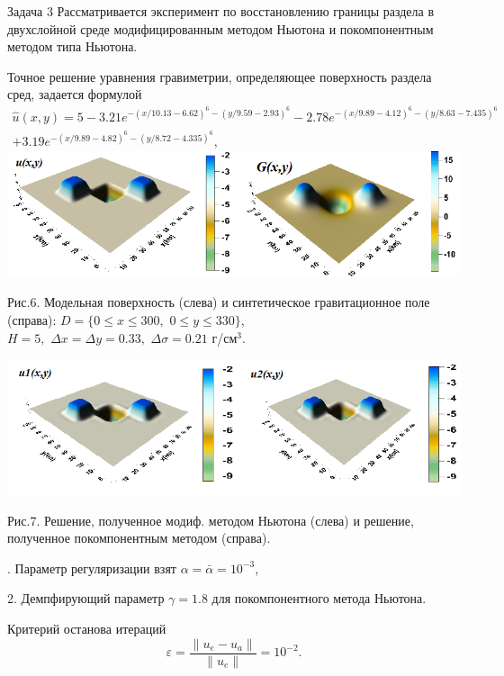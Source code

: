 \documentclass[10pt,pdf, mathserif, hyperref={unicode}]{beamer}
\begin{document}
\begin{frame}{Задача 3}
	Рассматривается эксперимент по восстановлению границы раздела в двухслойной среде модифицированным методом Ньютона и покомпонентным методом типа Ньютона.
	
	Точное решение уравнения гравиметрии, определяющее поверхность раздела сред, задается формулой
	\begin{equation*}
	\begin{aligned}
	\hat{u}(x,y)=5-3.21e^{-(x/10.13-6.62)^6-(y/9.59-2.93)^6}-2.78e^{-(x/9.89-4.12)^6-(y/8.63-7.435)^6}\\+3.19e^{-(x/9.89-4.82)^6-(y/8.72-4.335)^6},
	\end{aligned} 
	\end{equation*}
	\centering
	\includegraphics[width=\textwidth, height=0.35\textheight]{gravy_kiev2015.png}
	
	Рис.6. Модельная поверхность (слева) и синтетическое гравитационное поле (справа): $D=\{0\le x\le 300, \,\,0\le y\le 330\}$, \\ $  H=5,\,\,\Delta x=\Delta y=0.33,\,\,\Delta\sigma=0.21$ г/см$^3$.
\end{frame}
\begin{frame}
	\includegraphics[width=\textwidth, height=0.35\textheight]{gravy_kiev2015_methods.png}
	
	\centering
	Рис.7. Решение, полученное модиф. методом Ньютона (слева) и решение, полученное покомпонентным методом (справа).
	
	. Параметр регуляризации взят $\alpha=\bar{\alpha}=10^{-3}$,
	
	2. Демпфирующий параметр $\gamma=1.8$ для покомпонентного метода Ньютона.
	
	Критерий останова итераций $$\varepsilon=\frac{\|u_e-u_a\|}{\|u_e\|}=10^{-2}.$$
\end{frame}
\end{document}
